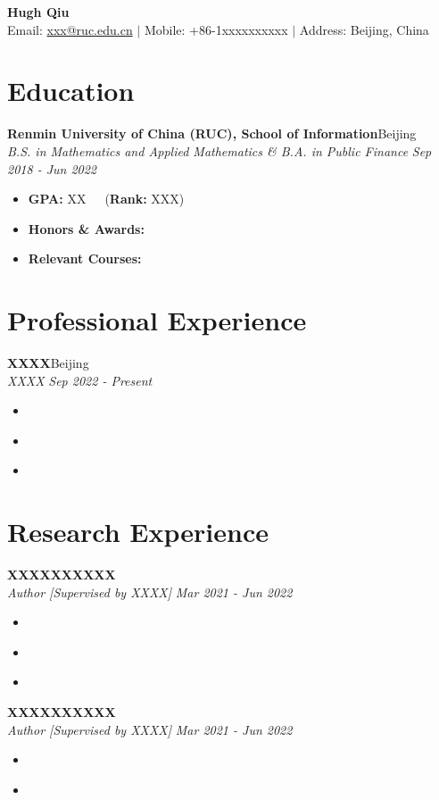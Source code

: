\documentclass[10.5pt,a4paper]{extarticle}%
\newcommand{\resumeItemWithoutTitle}[1]{
  \vspace{-3pt}\item\small{
    {#1}\vspace{-5pt}
  }
}
\newcommand{\resumeHeading}[4]{
\textbf{#1}\hfill #2\\
  \textit{\small#3} \hfill \textit{\small #4} \\
}
\newcommand{\resumeItemListStart}{\begin{itemize}[leftmargin=*]\vspace{-5pt}}
\newcommand{\resumeItemListEnd}{\end{itemize}\vspace{-5pt}}
\begin{document}
\begin{center}
    \textbf{{\huge Hugh Qiu}}\\
Email: \href{xxx@ruc.edu.cn}{xxx@ruc.edu.cn} $\vert$ Mobile: +86-1xxxxxxxxxx $\vert$ Address: Beijing, China
\end{center}

\vspace{-10pt}

\section{Education}
    \resumeHeading
      {Renmin University of China (RUC), School of Information}{Beijing}
      {B.S. in Mathematics and Applied Mathematics \& B.A. in Public Finance}{Sep 2018 - Jun 2022}
      \resumeItemListStart
      \resumeItemWithoutTitle{\scriptsize  \footnotesize{\textbf{GPA: }XX~~~(\textbf{Rank: }XXX})}
      \resumeItemWithoutTitle{\scriptsize  \footnotesize{\textbf{Honors \& Awards:} \lipsum[66]}}
      \resumeItemWithoutTitle{\scriptsize  \footnotesize{\textbf{Relevant Courses:} \lipsum[66]}}
	 \resumeItemListEnd

\vspace{0pt}
\section{Professional Experience}
    \resumeHeading{XXXX}{Beijing}
    {XXXX}{Sep 2022 - Present}
    \resumeItemListStart
   \resumeItemWithoutTitle{\lipsum[66]}

    \resumeItemWithoutTitle{\lipsum[66]}
    \resumeItemWithoutTitle{\lipsum[75]}
    \resumeItemListEnd



\vspace{0pt}
\section{Research Experience}
    \resumeHeading{XXXXXXXXXX}{}
    {Author [Supervised by XXXX]}{Mar 2021 - Jun 2022}
    \resumeItemListStart
    \resumeItemWithoutTitle{\lipsum[66]}
    \resumeItemWithoutTitle{\lipsum[66]}
    \resumeItemWithoutTitle{\lipsum[66]}
    \resumeItemListEnd
    
    \resumeHeading{XXXXXXXXXX}{}
    {Author [Supervised by XXXX]}{Mar 2021 - Jun 2022}
    \resumeItemListStart
    \resumeItemWithoutTitle{\lipsum[75]}
    \resumeItemWithoutTitle{\lipsum[66]}
    \resumeItemListEnd
\end{document}
